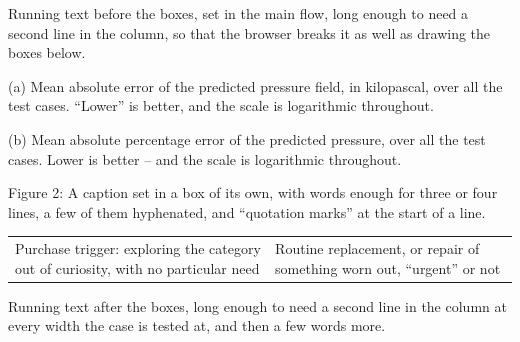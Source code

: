 \documentclass{article}
\begin{document}
Running text before the boxes, set in the main flow, long enough to need a second line in the
column, so that the browser breaks it as well as drawing the boxes below.

\noindent\begin{minipage}[t]{4cm}
(a) Mean absolute error of the predicted pressure field, in kilopascal, over all the test
cases. ``Lower'' is better, and the scale is logarithmic throughout.
\end{minipage}\hfill
\begin{minipage}[t]{4cm}
(b) Mean absolute percentage error of the predicted pressure, over all the test cases.
Lower is better -- and the scale is logarithmic throughout.
\end{minipage}

\noindent\parbox{6cm}{Figure 2: A caption set in a box of its own, with words enough for three
or four lines, a few of them hyphenated, and ``quotation marks'' at the start of a line.}

\begin{tabular}{p{3cm}p{3cm}}
Purchase trigger: exploring the category out of curiosity, with no particular need &
Routine replacement, or repair of something worn out, ``urgent'' or not\\
\end{tabular}

Running text after the boxes, long enough to need a second line in the column at every width the
case is tested at, and then a few words more.
\end{document}
